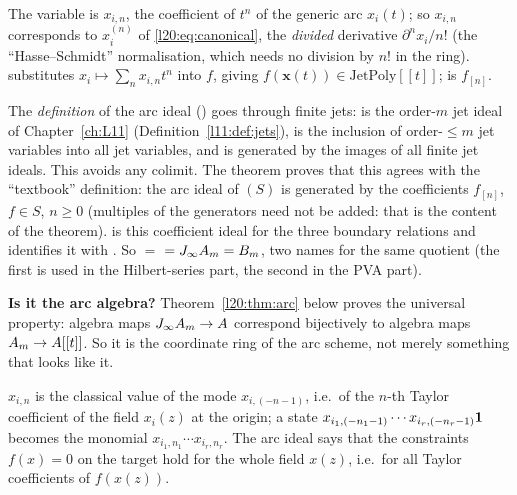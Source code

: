 \begin{dictionary}
The variable  is $x_{i,n}$, the coefficient of $t^n$ of the generic arc
$x_i(t)$; so $x_{i,n}$ corresponds to $x_i^{(n)}$ of \eqref{l20:eq:canonical}, the \emph{divided} derivative
$\partial^nx_i/n!$ (the ``Hasse--Schmidt'' normalisation, which needs no division by $n!$ in the ring).
 substitutes $x_i\mapsto\sum_nx_{i,n}t^n$ into $f$, giving
$f(\mathbf x(t))\in\mathrm{JetPoly}[[t]]$;  is $f_{[n]}$.

The \emph{definition} of the arc ideal () goes through finite jets: 
is the order-$m$ jet ideal of Chapter~\ref{ch:L11} (Definition~\ref{l11:def:jets}),  is the
inclusion of order-$\le m$ jet variables into all jet variables, and  is generated by the
images of all finite jet ideals. This avoids any colimit. The theorem
 proves that this agrees with the ``textbook'' definition: the arc
ideal of $(S)$ is generated by the coefficients $f_{[n]}$, $f\in S$, $n\ge0$ (multiples of the generators need
not be added: that is the content of the theorem).  is this coefficient ideal for the three
boundary relations and  identifies it with . So
 $=$  $=J_\infty A_m=B_m$, two names for the same
quotient (the first is used in the Hilbert-series part, the second in the PVA part).

\textbf{Is it the arc algebra?} Theorem~\ref{l20:thm:arc} below proves the universal property: algebra maps
$J_\infty A_m\to A$ correspond bijectively to algebra maps $A_m\to A[[t]]$. So it is the
coordinate ring of the arc scheme, not merely something that looks like it.
\end{dictionary}

\begin{physics}
$x_{i,n}$ is the classical value of the mode $x_{i,(-n-1)}$, i.e.\ of the $n$-th Taylor coefficient of the
field $x_i(z)$ at the origin; a state $x_{i_1,(-n_1-1)}\cdots x_{i_r,(-n_r-1)}\mathbf{1}$ becomes the monomial
$x_{i_1,n_1}\cdots x_{i_r,n_r}$. The arc ideal says that the constraints $f(x)=0$ on the target hold for the
whole field $x(z)$, i.e.\ for all Taylor coefficients of $f(x(z))$.
\end{physics}

